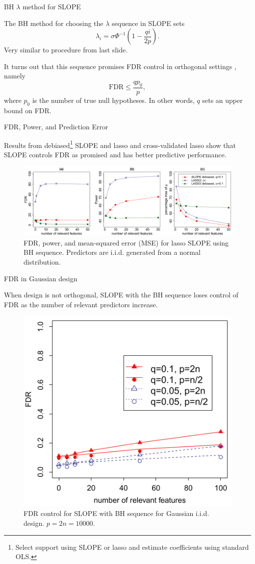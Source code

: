 \documentclass[10pt]{beamer}
\begin{document}
\begin{frame}{BH \(\lambda\) method for SLOPE}

The BH method for choosing the \(\lambda\) sequence in SLOPE sets
\[\lambda_i = \sigma\Phi^{-1}\left(1 - \frac{qi}{2p}\right).\]
Very similar to procedure from last slide.\medskip

It turns out that this sequence promises FDR control in \alert{orthogonal} settings \autocite[Theorem 1.1]{bogdan2015}, namely
\[
    \text{FDR}  \leq \frac{qp_0}{p},
\]
where \(p_0\) is the number of true null hypotheses. In other words, \(q\) sets an upper bound on FDR.
\end{frame}

\begin{frame}{FDR, Power, and Prediction Error}

Results from debiased\footnote{Select support using SLOPE or lasso and estimate coefficients using standard OLS.} SLOPE and lasso and cross-validated lasso show that SLOPE controls FDR as promised and has better predictive performance.

\begin{figure}
    \centering
    \includegraphics[width=\linewidth]{figures/bogdan-fig2.png}
    \caption{FDR, power, and mean-squared error (MSE) for lasso SLOPE using BH sequence. Predictors are i.i.d. generated from a normal distribution.}
\end{figure}
\end{frame}

\begin{frame}{FDR in Gaussian design}

When design is \alert{not} orthogonal, SLOPE with the BH sequence loses control of FDR
as the number of relevant predictors increase.

\begin{figure}
    \centering
    \includegraphics[width=0.5\linewidth]{figures/bogdan-fig5.png}
    \caption{FDR control for SLOPE with BH sequence for Gaussian i.i.d. design. \(p = 2n = 10000\).}
\end{figure}
\end{frame}
\end{document}
